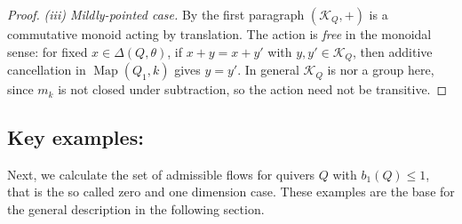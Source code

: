 \documentclass[12pt]{amsart}
\theoremstyle{plain}
\theoremstyle{definition}
\DeclareMathOperator{\map}{Map}
\begin{document}
\begin{proof}
\medskip
\noindent\emph{(iii) Mildly-pointed case.}
By the first paragraph $(\mathcal{K}_Q,+)$ is a commutative monoid acting by
translation. The action is \emph{free} in the monoidal sense: for fixed
$x \in \Delta(Q,\theta)$, if $x + y = x + y'$ with $y, y' \in \mathcal{K}_Q$,
then additive cancellation in $\map(Q_1,k)$ gives $y = y'$. In general $\mathcal{K}_Q$ is nor a group here, since $m_k$ is not closed under subtraction, so the
action need not be transitive.
\end{proof}




\subsection{Key examples:}
Next, we calculate the set of admissible flows for quivers $Q$ with $b_1(Q) \leq 1$, that is the so called zero and one dimension case.  These examples are the base for the general description in the following section. 
\end{document}
